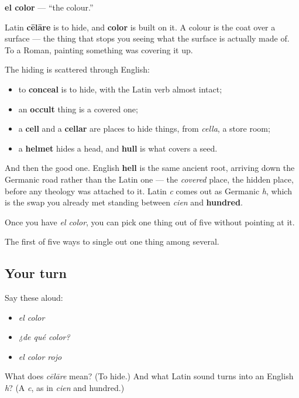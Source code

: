 \begin{cousinweb}
\textbf{el color} — \textquotedblleft{}the colour.\textquotedblright{}

Latin \textbf{cēlāre} is to hide, and \textbf{color} is built on it. A colour is the coat over a surface — the thing that stops you seeing what the surface is actually made of. To a Roman, painting something was covering it up.

The hiding is scattered through English:

\begin{itemize}
\raggedright
  \item to \textbf{conceal} is to hide, with the Latin verb almost intact;
  \item an \textbf{occult} thing is a covered one;
  \item a \textbf{cell} and a \textbf{cellar} are places to hide things, from \emph{cella}, a store room;
  \item a \textbf{helmet} hides a head, and \textbf{hull} is what covers a seed.
\end{itemize}

And then the good one. English \textbf{hell} is the same ancient root, arriving down the Germanic road rather than the Latin one — the \emph{covered} place, the hidden place, before any theology was attached to it. Latin \emph{c} comes out as Germanic \emph{h}, which is the swap you already met standing between \emph{cien} and \textbf{hundred}.

Once you have \emph{el color}, you can pick one thing out of five without pointing at it.
\end{cousinweb}

\begin{grammarlens}[title={What you've built}]
The first of five ways to single out one thing among several.
\end{grammarlens}

\subsection*{Your turn}
Say these aloud:

\begin{itemize}
\raggedright
  \item \emph{el color}
  \item \emph{¿de qué color?}
  \item \emph{el color rojo}
\end{itemize}

\begin{tcolorbox}[breakable,colback=teal!4,colframe=teal!35!black,title={Before you move on}]
What does \emph{cēlāre} mean? (To hide.) And what Latin sound turns into an English \emph{h}? (A \emph{c}, as in \emph{cien} and hundred.)
\end{tcolorbox}
